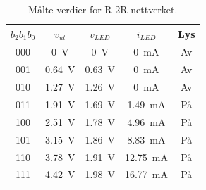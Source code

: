 \documentclass[11pt,a4paper,twocolumn]{article}
\begin{document}
\begin{table}
    \centering
    \begin{tabular}{c|c|c|c|c}
        $b_2b_1b_0$ & $v_{ut}$ & $v_{LED}$ & $i_{LED}$ & Lys \\
        \hline
        000 & \qty{0}{\volt}    & \qty{0}{\volt}    & \qty{0}{\milli\ampere}     & Av \\
        001 & \qty{0.64}{\volt} & \qty{0.63}{\volt} & \qty{0}{\milli\ampere}     & Av \\
        010 & \qty{1.27}{\volt} & \qty{1.26}{\volt} & \qty{0}{\milli\ampere}     & Av \\
        011 & \qty{1.91}{\volt} & \qty{1.69}{\volt} & \qty{1.49}{\milli\ampere}  & På \\
        100 & \qty{2.51}{\volt} & \qty{1.78}{\volt} & \qty{4.96}{\milli\ampere}  & På \\
        101 & \qty{3.15}{\volt} & \qty{1.86}{\volt} & \qty{8.83}{\milli\ampere}  & På \\
        110 & \qty{3.78}{\volt} & \qty{1.91}{\volt} & \qty{12.75}{\milli\ampere} & På \\
        111 & \qty{4.42}{\volt} & \qty{1.98}{\volt} & \qty{16.77}{\milli\ampere} & På \\
    \end{tabular}
    \caption{Målte verdier for R-2R-nettverket.}
    \label{tab:praktiske-verdier}
\end{table}
\end{document}
